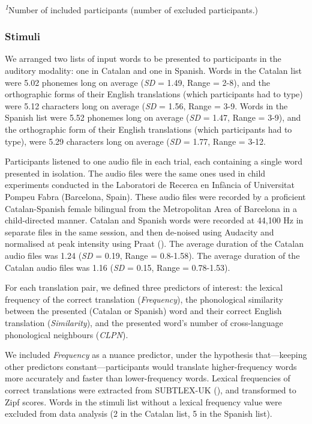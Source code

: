 \documentclass[
]{article}
\begin{document}
\begin{minipage}{\linewidth}
\textsuperscript{\textit{1}}Number of included participants (number of excluded participants.)\\
\end{minipage}

\subsubsection{Stimuli}\label{stimuli}

We arranged two lists of input words to be presented to participants in
the auditory modality: one in Catalan and one in Spanish. Words in the
Catalan list were 5.02 phonemes long on average (\emph{SD} = 1.49, Range
= 2-8), and the orthographic forms of their English translations (which
participants had to type) were 5.12 characters long on average
(\emph{SD} = 1.56, Range = 3-9. Words in the Spanish list were 5.52
phonemes long on average (\emph{SD} = 1.47, Range = 3-9), and the
orthographic form of their English translations (which participants had
to type), were 5.29 characters long on average (\emph{SD} = 1.77, Range
= 3-12.

Participants listened to one audio file in each trial, each containing a
single word presented in isolation. The audio files were the same ones
used in child experiments conducted in the Laboratori de Recerca en
Infància of Universitat Pompeu Fabra (Barcelona, Spain). These audio
files were recorded by a proficient Catalan-Spanish female bilingual
from the Metropolitan Area of Barcelona in a child-directed manner.
Catalan and Spanish words were recorded at 44,100 Hz in separate files
in the same session, and then de-noised using Audacity and normalised at
peak intensity using Praat (). The average duration of the Catalan audio files was
1.24 (\emph{SD} = 0.19, Range = 0.8-1.58). The average duration of the
Catalan audio files was 1.16 (\emph{SD} = 0.15, Range = 0.78-1.53).

For each translation pair, we defined three predictors of interest: the
lexical frequency of the correct translation (\emph{Frequency}), the
phonological similarity between the presented (Catalan or Spanish) word
and their correct English translation (\emph{Similarity}), and the
presented word's number of cross-language phonological neighbours
(\emph{CLPN}).

We included \emph{Frequency} as a nuance predictor, under the hypothesis
that---keeping other predictors constant---participants would translate
higher-frequency words more accurately and faster than lower-frequency
words. Lexical frequencies of correct translations were extracted from
SUBTLEX-UK (), and
transformed to Zipf scores. Words in the stimuli list without a lexical
frequency value were excluded from data analysis (2 in the Catalan list,
5 in the Spanish list).
\end{document}
